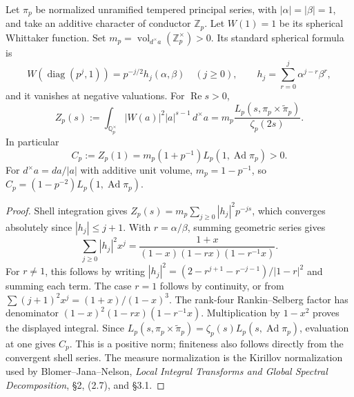\begin{lemma}
\label{v4-arith:bcglue-k5:lem:spherical-norm}
Let \(\pi_p\) be normalized unramified tempered principal series,
with \(|\alpha|=|\beta|=1\), and take an additive character of
conductor \(\mathbb Z_p\). Let \(W(1)=1\) be its spherical
Whittaker function. Set \(m_p=\operatorname{vol}_{d^\times a}
(\mathbb Z_p^\times)>0\). Its standard spherical formula is
\[
 W(\operatorname{diag}(p^j,1))=p^{-j/2}h_j(\alpha,\beta)
 \quad(j\ge0),\qquad
 h_j=\sum_{r=0}^j\alpha^{j-r}\beta^r,
\]
and it vanishes at negative valuations. For \(\operatorname{Re}s>0\),
\begin{equation}
\label{v4-arith:bcglue-k5:eq:GJ-funeq}
 Z_p(s):=\int_{\mathbb Q_p^\times}|W(a)|^2|a|^{s-1}\,d^\times a
 =m_p\frac{L_p(s,\pi_p\times\widetilde\pi_p)}{\zeta_p(2s)}.
\end{equation}
In particular
\[
 C_p:=Z_p(1)=m_p(1+p^{-1})L_p(1,\operatorname{Ad}\pi_p)>0.
\]
For \(d^\times a=da/|a|\) with additive unit volume,
\(m_p=1-p^{-1}\), so \(C_p=(1-p^{-2})L_p(1,\operatorname{Ad}\pi_p)\).
\end{lemma}
\begin{proof}
Shell integration gives
\(Z_p(s)=m_p\sum_{j\ge0}|h_j|^2p^{-js}\), which converges
absolutely since \(|h_j|\le j+1\). With \(r=\alpha/\beta\),
summing geometric series gives
\[
 \sum_{j\ge0}|h_j|^2x^j
 =\frac{1+x}{(1-x)(1-rx)(1-r^{-1}x)}.
\]
For \(r\ne1\), this follows by writing
\(|h_j|^2=(2-r^{j+1}-r^{-j-1})/|1-r|^2\) and summing each term.
The case \(r=1\) follows by continuity, or from
\(\sum(j+1)^2x^j=(1+x)/(1-x)^3\).
The rank-four Rankin--Selberg factor has denominator
\((1-x)^2(1-rx)(1-r^{-1}x)\). Multiplication by \(1-x^2\)
proves the displayed integral. Since
\(L_p(s,\pi_p\times\widetilde\pi_p)=\zeta_p(s)L_p(s,\operatorname{Ad}\pi_p)\),
evaluation at one gives \(C_p\). This is a positive norm; finiteness
also follows directly from the convergent shell series. The measure
normalization is the Kirillov normalization used by
Blomer--Jana--Nelson, \emph{Local Integral Transforms and Global
Spectral Decomposition}, \S2, (2.7), and \S3.1.
\end{proof}

